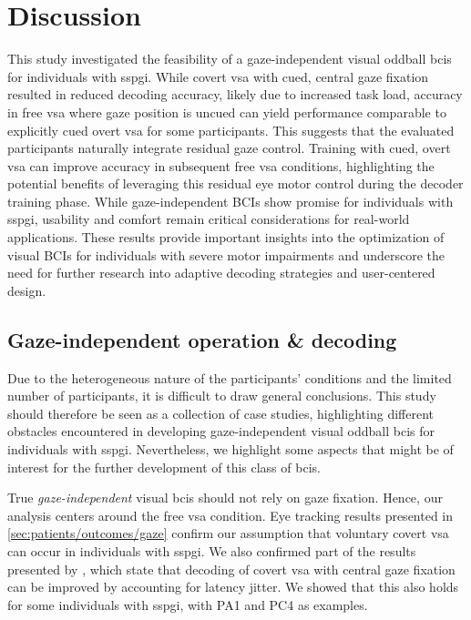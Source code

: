 \documentclass{article}
\begin{document}
\section{Discussion}

This study investigated the feasibility of a gaze-independent visual oddball
\acp{bci} for individuals with \ac{sspgi}.
While covert \ac{vsa} with cued, central gaze fixation resulted in reduced decoding
accuracy, likely due to increased task load, accuracy in free \ac{vsa} where gaze position is uncued can
yield performance comparable to explicitly cued overt \ac{vsa} for some
participants.
This suggests that the evaluated participants naturally integrate residual gaze control.
Training with cued, overt \ac{vsa} can improve accuracy in subsequent free \ac{vsa} conditions,
highlighting the potential benefits of leveraging this residual eye motor control
during the decoder training phase.
While gaze-independent BCIs show promise for individuals with \ac{sspgi},
usability and comfort remain critical considerations for real-world applications.
These results provide important insights into the optimization of visual BCIs for individuals with severe motor impairments and underscore the need for further research into adaptive decoding strategies and user-centered design.

\subsection{Gaze-independent operation \& decoding}
Due to the heterogeneous nature of the participants' conditions and the limited
number of participants, it is difficult to draw general conclusions.
This study should therefore be seen as a collection of case studies,
highlighting different obstacles encountered in developing gaze-independent
visual oddball \acp{bci} for individuals with \ac{sspgi}.
Nevertheless, we highlight some aspects that might be
of interest for the further development of this class of \acp{bci}.

True \emph{gaze-independent} visual \acp{bci} should not rely on gaze fixation.
Hence, our analysis centers around the free \ac{vsa} condition.
Eye tracking results presented in \cref{sec:patients/outcomes/gaze}
confirm our assumption that voluntary covert \ac{vsa} can
occur in individuals with \ac{sspgi}.
We also confirmed part of the results presented by \textcite{VanDenKerchove2024},
which state that decoding of covert \ac{vsa} with central gaze
fixation can be improved by accounting for latency jitter. We showed that this
also holds for some individuals with \ac{sspgi}, with PA1 and PC4 as examples.
\end{document}
